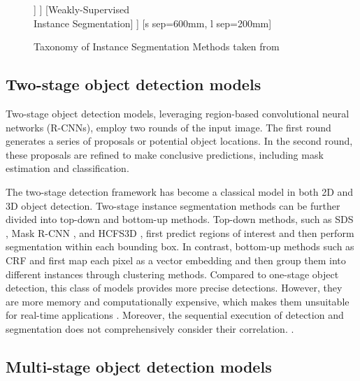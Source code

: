 \begin{figure}[h]
\begin{forest}
		[Cascade, label={[align=center,font=\tiny]below:  Cascade R-CNN \\\cite{cai2019cascade}, \\HTC \cite{chen2019hybrid}}]
		[Attention, label={[align=center,font=\tiny]below:  ISTR \cite{hu2021istr},\\QueryInst \cite{fang2021instances}, \\SOLG \cite{dong2021solq} }]
		]
		]
		[Weakly-Supervised  \\ Instance Segmentation]
		]
		[s sep=600mm, l sep=200mm] %
	\end{forest}
	\caption{Taxonomy of Instance Segmentation Methods taken from \cite{2dISreview}}
	\label{fig:instance_segmentation_taxonomy}
\end{figure}

\subsection{Two-stage object detection models}

Two-stage object detection models, leveraging region-based convolutional neural networks (R-CNNs), employ two rounds of the input image. The first round generates a series of proposals or potential object locations. In the second round, these proposals are refined to make conclusive predictions, including mask estimation and classification. 

The two-stage detection framework has become a classical model in both 2D and 3D object detection. Two-stage instance segmentation methods can be further divided into top-down and bottom-up methods. Top-down methods, such as SDS \cite{hariharan2014simultaneous}, Mask R-CNN \cite{he2017mask}, and HCFS3D \cite{tan2021hcfs3d}, first predict regions of interest and then perform segmentation within each bounding box. In contrast, bottom-up methods such as CRF \cite{arnab2016bottom} and \cite{newell2017associative} first map each pixel as a vector embedding and then group them into different instances through clustering methods. Compared to one-stage object detection, this class of models provides more precise detections. However, they are more memory and computationally expensive, which makes them unsuitable for real-time applications \cite{comprehensiveSeg}. Moreover, the sequential execution of detection and segmentation does not comprehensively consider their correlation. \cite{2dISreview}.  

\subsection{Multi-stage object detection models}

